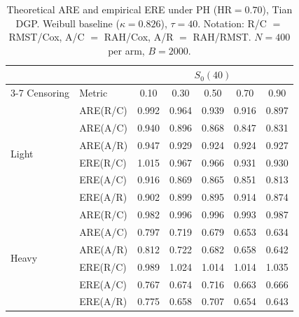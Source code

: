 \begin{table}[ht]
\centering
\small
\caption{Theoretical ARE and empirical ERE under PH (HR$=0.70$), Tian DGP.
  Weibull baseline ($\kappa=0.826$), $\tau=40$.
  Notation: R/C $=$ RMST/Cox, A/C $=$ RAH/Cox, A/R $=$ RAH/RMST.
  $N=400$ per arm, $B=2000$.}
\label{tab:main-sim-ph-hr070-s0-010-090-light-heavy}
\setlength{\tabcolsep}{4pt}
\begin{tabular}{llccccc}
\hline
& & \multicolumn{5}{c}{$S_0(40)$} \\
\cline{3-7}
Censoring & Metric & 0.10 & 0.30 & 0.50 & 0.70 & 0.90 \\
\hline
  \multirow{6}{*}{Light} & ARE(R/C) & 0.992 & 0.964 & 0.939 & 0.916 & 0.897 \\
   & ARE(A/C) & 0.940 & 0.896 & 0.868 & 0.847 & 0.831 \\
   & ARE(A/R) & 0.947 & 0.929 & 0.924 & 0.924 & 0.927 \\
   & ERE(R/C) & 1.015 & 0.967 & 0.966 & 0.931 & 0.930 \\
   & ERE(A/C) & 0.916 & 0.869 & 0.865 & 0.851 & 0.813 \\
   & ERE(A/R) & 0.902 & 0.899 & 0.895 & 0.914 & 0.874 \\
\hline
  \multirow{6}{*}{Heavy} & ARE(R/C) & 0.982 & 0.996 & 0.996 & 0.993 & 0.987 \\
   & ARE(A/C) & 0.797 & 0.719 & 0.679 & 0.653 & 0.634 \\
   & ARE(A/R) & 0.812 & 0.722 & 0.682 & 0.658 & 0.642 \\
   & ERE(R/C) & 0.989 & 1.024 & 1.014 & 1.014 & 1.035 \\
   & ERE(A/C) & 0.767 & 0.674 & 0.716 & 0.663 & 0.666 \\
   & ERE(A/R) & 0.775 & 0.658 & 0.707 & 0.654 & 0.643 \\
\hline
\end{tabular}
\end{table}
